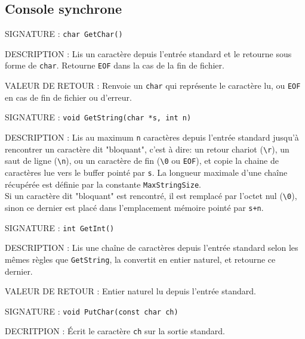 \documentclass{article}
\begin{document}
	\subsection{Console synchrone}
		\begin{description}
			\item{SIGNATURE : } \texttt{char GetChar()}
			\item{DESCRIPTION :}{ Lis un caractère depuis l'entrée standard et le retourne sous forme de \texttt{char}. Retourne \texttt{EOF} dans la cas de la fin de fichier.}
			\item{VALEUR DE RETOUR : } Renvoie un \texttt{char} qui représente le caractère lu, ou \texttt{EOF} en cas de fin de fichier ou d'erreur.
		\end{description}
		\vspace{2.5mm}
		\begin{description}
			\item{SIGNATURE : } \texttt{void GetString(char *s, int n)}
			\item{DESCRIPTION : } Lis au maximum \texttt{n} caractères depuis l'entrée standard jusqu'à rencontrer un caractère dit "bloquant", c'est à dire: un retour chariot (\texttt{\textbackslash{}r}), un saut de ligne (\texttt{\textbackslash{}n}), ou un caractère de fin (\texttt{\textbackslash{}0} ou \texttt{EOF}), et copie la chaine de caractères lue vers le buffer pointé par \texttt{s}. La longueur maximale d'une chaîne récupérée est définie par la constante \texttt{MaxStringSize}. \\Si un caractère dit "bloquant" est rencontré, il est remplacé par l'octet nul (\texttt{\textbackslash{}0}), sinon ce dernier est placé dans l'emplacement mémoire pointé par \texttt{s+n}.
		\end{description}
		\vspace{2.5mm}
		\begin{description}
			\item{SIGNATURE : } \texttt{int GetInt()}
			\item{DESCRIPTION : } Lis une chaîne de caractères depuis l'entrée standard selon les mêmes règles que \texttt{GetString}, la convertit en entier naturel, et retourne ce dernier.
			\item{VALEUR DE RETOUR : } Entier naturel lu depuis l'entrée standard.
		\end{description}
		\vspace{2.5mm}
		\begin{description}
			\item{SIGNATURE : } \texttt{void PutChar(const char ch)}
			\item{DECRITPION : } Écrit le caractère \texttt{ch} sur la sortie standard. 
		\end{description}
\end{document}
